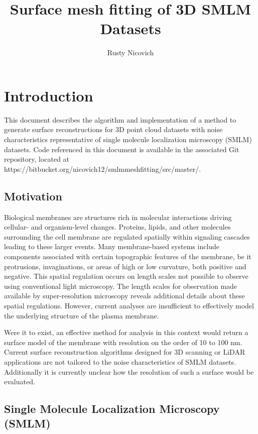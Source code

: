 \documentclass[10pt,a4paper]{article}
\author{Rusty Nicovich}
\title{Surface mesh fitting of 3D SMLM Datasets}
\begin{document}
\maketitle

\section{Introduction}

This document describes the algorithm and implementation of a method to generate surface reconstructions for 3D point cloud datasets with noise characteristics representative of single molecule localization microscopy (SMLM) datasets. Code referenced in this document is available in the associated Git repository, located at https://bitbucket.org/nicovich12/smlmmeshfitting/src/master/.

\subsection{Motivation}

Biological membranes are structures rich in molecular interactions driving cellular- and organism-level changes.  Proteins, lipids, and other molecules surrounding the cell membrane are regulated spatially within signaling cascades leading to these larger events.  Many membrane-based systems include components associated with certain topographic features of the membrane, be it protrusions, invaginations, or areas of high or low curvature, both positive and negative.  This spatial regulation occurs on length scales not possible to observe using conventional light microscopy.  The length scales for observation made available by super-resolution microscopy reveals additional details about these spatial regulations.  However, current analyses are insufficient to effectively model the underlying structure of the plasma membrane.  

Were it to exist, an effective method for analysis in this context would return a surface model of the membrane with resolution on the order of 10 to 100 nm.  Current surface reconstruction algorithms designed for 3D scanning or LiDAR applications are not tailored to the noise characteristics of SMLM datasets.  Additionally it is currently unclear how the resolution of such a surface would be evaluated.   

\subsection{Single Molecule Localization Microscopy (SMLM)}
\end{document}

